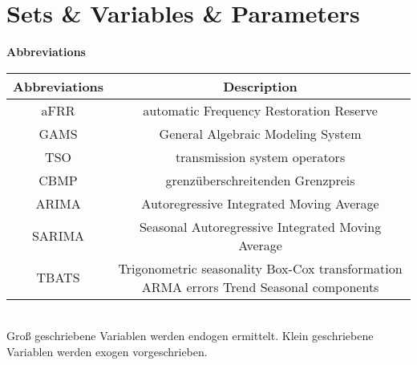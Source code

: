 \chapter*{Sets \& Variables \& Parameters}
\textbf{Abbreviations}
\begin{table}[!h]
	\begin{tabular}{c|c}
		Abbreviations & Description                                                                            \\
		\hline
		aFRR          & automatic Frequency Restoration Reserve                                                \\
		GAMS          & General Algebraic Modeling System                                                      \\
		TSO           & transmission system operators                                                          \\
		CBMP          & grenzüberschreitenden Grenzpreis                                                       \\
		ARIMA         & Autoregressive Integrated Moving Average                                               \\
		SARIMA        & Seasonal Autoregressive Integrated Moving Average                                      \\
		TBATS         & Trigonometric seasonality Box-Cox transformation ARMA errors Trend Seasonal components \\
	\end{tabular}
\end{table}\\

Groß geschriebene Variablen werden endogen ermittelt. Klein geschriebene Variablen werden exogen vorgeschrieben.\\

